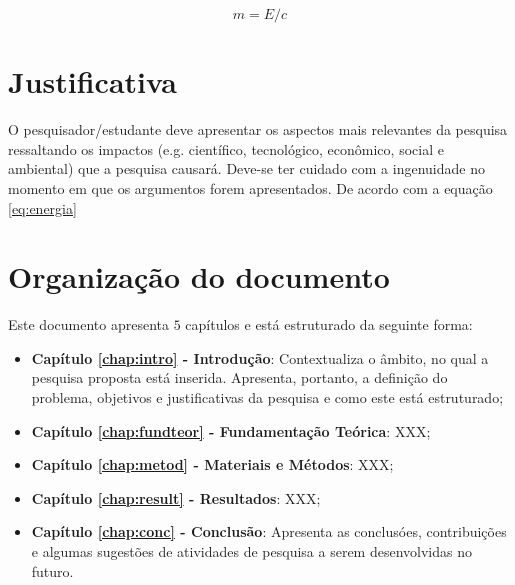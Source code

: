 \begin{equation}
  m=E/c
\end{equation}


\section{Justificativa}
\label{sec:justi}

O pesquisador/estudante deve apresentar os aspectos mais
relevantes da pesquisa ressaltando os impactos (e.g. cient\'ifico,
tecnol\'ogico, econ\^omico, social e ambiental) que a pesquisa
causar\'a. Deve-se ter cuidado com a ingenuidade no momento em que
os argumentos forem apresentados.
De acordo com a equação \ref{eq:energia}




\section{Organização do documento}
\label{section:organizacao}

Este documento apresenta $5$ capítulos e está estruturado da seguinte forma:

\begin{itemize}

  \item \textbf{Capítulo \ref{chap:intro} - Introdução}: Contextualiza o âmbito, no qual a pesquisa proposta está inserida. Apresenta, portanto, a definição do problema, objetivos e justificativas da pesquisa e como este \thetypeworkthree está estruturado;
  \item \textbf{Capítulo \ref{chap:fundteor} - Fundamentação Teórica}: XXX;
  \item \textbf{Capítulo \ref{chap:metod} - Materiais e Métodos}: XXX;
  \item \textbf{Capítulo \ref{chap:result} - Resultados}: XXX;
  \item \textbf{Capítulo \ref{chap:conc} - Conclusão}: Apresenta as conclusóes, contribuições e algumas sugestões de atividades de pesquisa a serem desenvolvidas no futuro.

\end{itemize}
